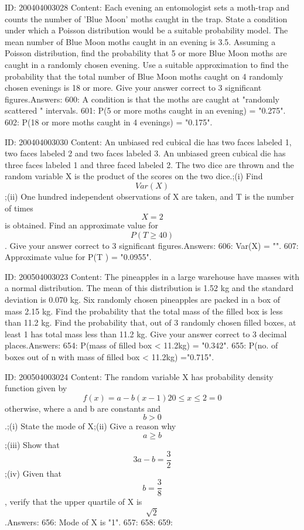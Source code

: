 \documentclass{article}
\begin{document}
ID: 200404003028
Content:
Each evening an entomologist sets a moth-trap and counts the number of 'Blue Moon' moths caught in the trap. State a condition under which a Poisson distribution would be a suitable probability model.  The mean number of Blue Moon moths caught in an evening is 3.5. Assuming a Poisson distribution, find the probability that 5 or more Blue Moon moths are caught in a randomly chosen evening.  Use a suitable approximation to find the probability that the total number of Blue Moon moths caught on 4 randomly chosen evenings is 18 or more. Give your answer correct to 3 significant figures.Answers:
600: A condition is that the moths are caught at "randomly scattered " intervals.
601: P(5 or more moths caught in an evening) = "0.275".
602: P(18 or more moths caught in 4 evenings) = "0.175".

ID: 200404003030
Content:
An unbiased red cubical die has two faces labeled 1, two faces labeled 2 and two faces labeled 3. An unbiased green cubical die has three faces labeled 1 and three faced labeled 2. The two dice are thrown and the random variable X is the product of the scores on the two dice.;(i) Find $$Var(X)$$;(ii) One hundred independent observations of X are taken, and T is the number of times $$X = 2$$ is obtained. Find an approximate value for $$P\left(T \geq 40\right)$$. Give your answer correct to 3 significant figures.Answers:
606: Var(X) = "".
607: Approximate value for P\left(T \right) = "0.0955".

ID: 200504003023
Content:
The pineapples in a large warehouse have masses with a normal distribution. The mean of this distribution is 1.52 kg and the standard deviation is 0.070 kg. Six randomly chosen pineapples are packed in a box of mass 2.15 kg. Find the probability that the total mass of the filled box is less than 11.2 kg. Find the probability that, out of 3 randomly chosen filled boxes, at least 1 has total mass less than 11.2 kg. Give your answer correct to 3 decimal places.Answers:
654: P(mass of filled box < 11.2kg) = "0.342".
655: P(no. of boxes out of n with mass of filled box < 11.2kg) ="0.715".

ID: 200504003024
Content:
The random variable X has probability density function given by $$f(x) = a-b(x-1)2  0 \leq x \leq 2  = 0 $$ otherwise,  where a and b are constants and $$b > 0$$.;(i) State the mode of X;(ii) Give a reason why $$a \geq b$$;(iii) Show that $$3a - b = \frac{3}{2}$$;(iv) Given that $$b = \frac{3}{8}$$, verify that the upper quartile of X is $$\sqrt 2$$.Answers:
656: Mode of X is "1".
657: 
658: 
659: 
\end{document}
